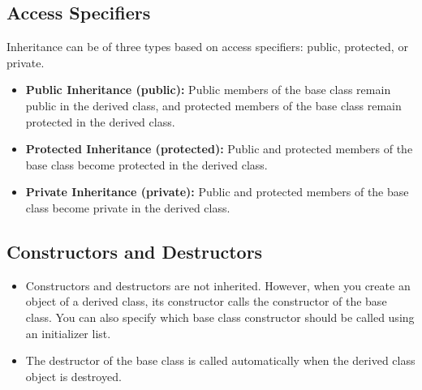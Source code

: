 \documentclass{report}
\begin{document}
    \bigbreak \noindent 
    \subsection{Access Specifiers}
    \bigbreak \noindent 
    Inheritance can be of three types based on access specifiers: public, protected, or private.
    \begin{itemize}
        \item \textbf{Public Inheritance (public):} Public members of the base class remain public in the derived class, and protected members of the base class remain protected in the derived class.
        \item \textbf{Protected Inheritance (protected):} Public and protected members of the base class become protected in the derived class.
        \item \textbf{Private Inheritance (private):} Public and protected members of the base class become private in the derived class.
    \end{itemize}

    \pagebreak \bigbreak \noindent 
    \subsection{Constructors and Destructors}
    \bigbreak \noindent 
    \begin{concept}
       \begin{itemize}
           \item Constructors and destructors are not inherited. However, when you create an object of a derived class, its constructor calls the constructor of the base class. You can also specify which base class constructor should be called using an initializer list.
           \item The destructor of the base class is called automatically when the derived class object is destroyed.
       \end{itemize} 
    \end{concept}

    \bigbreak \noindent 
\end{document}
